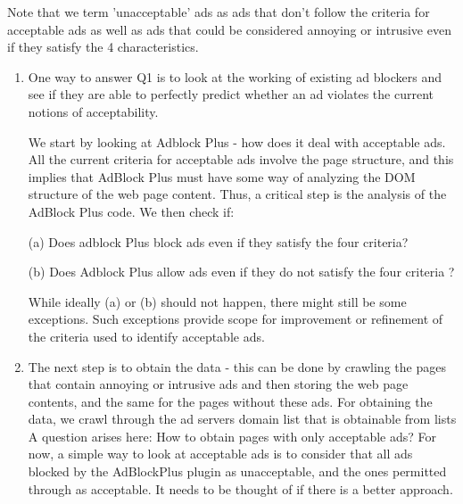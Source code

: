 Note that we term 'unacceptable' ads as ads that don't follow the criteria for acceptable ads as well as ads that could be considered annoying or intrusive even if they satisfy the 4 characteristics.
\begin{enumerate}
 \item One way to answer Q1 is to look at the working of existing ad blockers and see if they are able to perfectly predict whether an ad violates the current notions of acceptability.

 We start by looking at Adblock Plus - how does it deal with acceptable ads.
 All the current criteria for acceptable ads involve the page structure, and this implies that AdBlock Plus must have some way of analyzing the DOM structure of the web page content. Thus, a critical step is the analysis of the AdBlock Plus code. We then check if:

 (a) Does adblock Plus block ads even if they satisfy the four criteria?

 (b) Does Adblock Plus allow ads even if they do not satisfy the four criteria ?

 While ideally (a) or (b) should not happen, there might still be some exceptions. Such exceptions provide scope for improvement or refinement of the criteria used to identify acceptable ads.

 \item The next step is to obtain the data -  this can be done by crawling the pages that contain annoying or intrusive ads and then storing the web page contents, and the same for the pages without these ads. For obtaining the data, we crawl through the ad servers domain list that is obtainable from lists \cite{CommonCrawl} \cite{crussell2014madfraud} \cite{PeterLowe2013}
  A question arises here: How to obtain pages with only acceptable ads?
  For now, a simple way to look at acceptable ads is to consider that all ads blocked by the AdBlockPlus plugin as unacceptable, and the ones permitted through as acceptable. It needs to be thought of if there is a better approach.


\end{enumerate}
